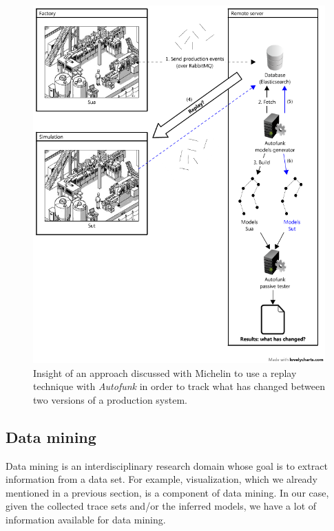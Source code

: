 \begin{figure}[h]
    \begin{center}
        \includegraphics[width=0.96\linewidth]{figures/autofunk_active.png}
    \end{center}

    \caption{Insight of an approach discussed with Michelin to
    use a replay technique with \textit{Autofunk} in order to
    track what has changed between two versions of a production
    system.}
    \label{fig:autofunk_active}
\end{figure}

\subsection{Data mining}
\label{sec:conclusion:testing:data}

Data mining \cite{chakrabarti2006data} is an interdisciplinary
research domain whose goal is to extract information from a data
set. For example, visualization, which we already mentioned in a
previous section, is a component of data mining. In our case,
given the collected trace sets and/or the inferred models, we
have a lot of information available for data mining.

